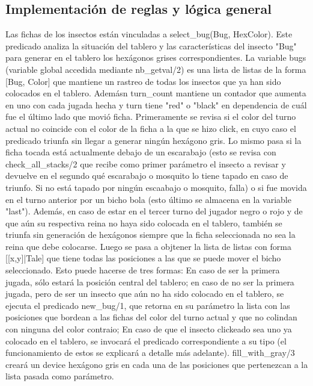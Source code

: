 \documentclass[a4paper,12pt]{article}
\begin{document}
\subsection*{Implementación de reglas y lógica general}
Las fichas de los insectos están vinculadas a select\_bug(Bug, HexColor). Este predicado analiza la situación del tablero y las características del insecto "Bug" para generar en el tablero los hexágonos grises correspondientes. La variable bugs (variable global accedida mediante nb\_getval/2) es una lista de listas de la forma [Bug, Color] que mantiene un rastreo de todas los insectos que ya han sido colocados en el tablero. Ademásn turn\_count mantiene un contador que aumenta en uno con cada jugada hecha y turn tiene "red" o "black" en dependencia de cuál fue el último lado que movió ficha. Primeramente se revisa si el color del turno actual no coincide con el color de la ficha a la que se hizo click, en cuyo caso el predicado triunfa sin llegar a generar ningún hexágono gris. Lo mismo pasa si la ficha tocada está actualmente debajo de un escarabajo (esto se revisa con check\_all\_stacks/2 que recibe como primer parámetro el insecto a revisar y devuelve en el segundo qué escarabajo o mosquito lo tiene tapado en caso de triunfo. Si no está tapado por ningún escaabajo o mosquito, falla) o si fue movida en el turno anterior por un bicho bola (esto último se almacena en la variable "last"). Además, en caso de estar en el tercer turno del jugador negro o rojo y de que aún su respectiva reina no haya sido colocada en el tablero, también se triunfa sin generación de hexágonos siempre que la ficha seleccionada no sea la reina que debe colocarse. Luego se pasa a objtener la lista de listas con forma [[x,y]|Tale] que tiene todas las posiciones a las que se puede mover el bicho seleccionado. Esto puede hacerse de tres formas: En caso de ser la primera jugada, sólo estará la posición central del tablero; en caso de no ser la primera jugada, pero de ser un insecto que aún no ha sido colocado en el tablero, se ejecuta el predicado new\_bug/1, que retorna en su parámetro la lista con las posiciones que bordean a las fichas del color del turno actual y que no colindan con ninguna del color contraio; En caso de que el insecto clickeado sea uno ya colocado en el tablero, se invocará el predicado correspondiente a su tipo (el funcionamiento de estos se explicará a detalle más adelante). fill\_with\_gray/3 creará un device hexágono gris en cada una de las posiciones que pertenezcan a la lista pasada como parámetro.\\
\end{document}
